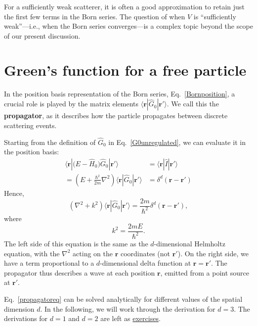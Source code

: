\documentclass[pra,12pt]{revtex4-2}
\begin{document}
For a sufficiently weak scatterer, it is often a good approximation to
retain just the first few terms in the Born series.  The question of
when $\hat{V}$ is ``sufficiently weak''---i.e., when the Born series
converges---is a complex topic beyond the scope of our present
discussion.

\section{Green's function for a free particle}
\label{sec:freegreen}

In the position basis representation of the Born series,
Eq.~\eqref{Bornposition}, a crucial role is played by the matrix
elements $\langle\mathbf{r}|\hat{G}_0|\mathbf{r}'\rangle$.  We call
this the \textbf{propagator}, as it describes how the particle
propagates between discrete scattering events.

Starting from the definition of $\hat{G}_0$ in
Eq.~\eqref{G0unregulated}, we can evaluate it in the position basis:
\begin{align*}
  \langle\mathbf{r} |\big(E-\hat{H}_0\big) \hat{G}_0 |\mathbf{r}'\rangle &= \langle\mathbf{r}|\hat{I}|\mathbf{r}'\rangle \\
  = \left(E + \frac{\hbar^2}{2m}\nabla^2 \right) \langle\mathbf{r} |\hat{G}_0 |\mathbf{r}'\rangle &= \delta^d(\mathbf{r}-\mathbf{r}')
\end{align*}
Hence,
\begin{equation}
  \left(\nabla^2 + k^2\right) \langle\mathbf{r} |\hat{G}_0 |\mathbf{r}'\rangle = \frac{2m}{\hbar^2} \delta^d(\mathbf{r}-\mathbf{r}'),
  \label{propagatoreq}
\end{equation}
where
\begin{equation}
  k^2 = \frac{2mE}{\hbar^2}.
  \label{keq}
\end{equation}
The left side of this equation is the same as the $d$-dimensional
Helmholtz equation, with the $\nabla^2$ acting on the $\mathbf{r}$
coordinates (not $\mathbf{r}'$).  On the right side, we have a term
proportional to a $d$-dimensional delta function at $\mathbf{r} =
\mathbf{r}'$.  The propagator thus describes a wave at each position
$\mathbf{r}$, emitted from a point source at $\mathbf{r}'$.

Eq.~\eqref{propagatoreq} can be solved analytically for different
values of the spatial dimension $d$.  In the following, we will work
through the derivation for $d = 3$.  The derivations for $d = 1$ and
$d = 2$ are left as \hyperref[ex:1dpropagator]{exercises}.
\end{document}
